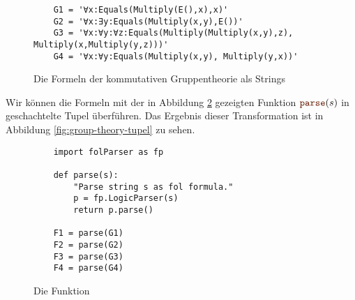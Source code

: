 \begin{figure}[!ht]
\centering
\begin{verbatim}
    G1 = '∀x:Equals(Multiply(E(),x),x)'                  
    G2 = '∀x:∃y:Equals(Multiply(x,y),E())'
    G3 = '∀x:∀y:∀z:Equals(Multiply(Multiply(x,y),z), Multiply(x,Multiply(y,z)))'
    G4 = '∀x:∀y:Equals(Multiply(x,y), Multiply(y,x))'
\end{verbatim}
\vspace*{-0.3cm}
\caption{Die Formeln der kommutativen Gruppentheorie als Strings}
\label{fig:group-theory}
\end{figure}

Wir können die Formeln mit der in Abbildung \ref{fig:fol-parse.py} gezeigten Funktion $\mytt{parse}(s)$ in
geschachtelte Tupel überführen.  Das Ergebnis dieser Transformation ist in Abbildung
\ref{fig:group-theory-tupel} zu sehen.


\begin{figure}[!ht]
\centering
\begin{verbatim}
    import folParser as fp
    
    def parse(s):
        "Parse string s as fol formula."
        p = fp.LogicParser(s)
        return p.parse()

    F1 = parse(G1)
    F2 = parse(G2)
    F3 = parse(G3)
    F4 = parse(G4)
\end{verbatim}
\vspace*{-0.3cm}
\caption{Die Funktion }
\label{fig:fol-parse.py}
\end{figure}

